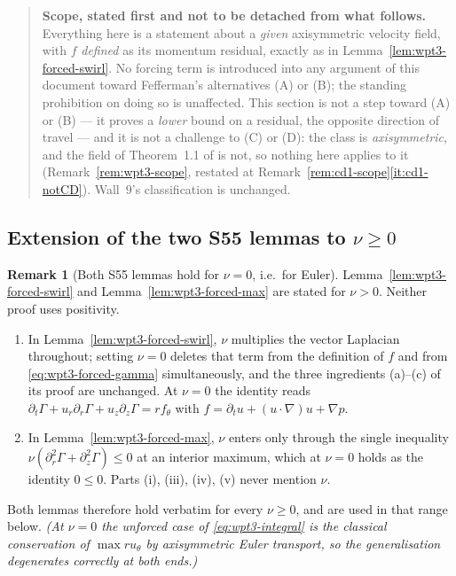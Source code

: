 \documentclass[11pt]{article}
\theoremstyle{definition}
\newtheorem{remark}[theorem]{Remark}
\theoremstyle{remark}
\newcommand{\grad}{\nabla}
\begin{document}
\begin{quote}\small
  \textbf{Scope, stated first and not to be detached from what follows.}
  Everything here is a statement about a \emph{given} axisymmetric velocity
  field, with $f$ \emph{defined} as its momentum residual, exactly as in
  Lemma~\ref{lem:wpt3-forced-swirl}. No forcing term is introduced into any
  argument of this document toward Fefferman's alternatives (A) or (B); the
  standing prohibition on doing so is unaffected. This section is not a step
  toward (A) or (B) --- it proves a \emph{lower} bound on a residual, the
  opposite direction of travel --- and it is not a challenge to (C) or (D):
  the class is \emph{axisymmetric}, and the field of Theorem~1.1 of
  \cite{OpenAI2026} is not, so nothing here applies to it
  (Remark~\ref{rem:wpt3-scope}, restated at
  Remark~\ref{rem:cd1-scope}\ref{it:cd1-notCD}). Wall~9's classification is
  unchanged.
\end{quote}

\subsection{Extension of the two S55 lemmas to \texorpdfstring{$\nu\geq0$}{nu
  >= 0}}
\label{subsec:cd1-nu0}

\begin{remark}[Both S55 lemmas hold for $\nu=0$, i.e.\ for Euler]
  \label{rem:cd1-euler}
  Lemma~\ref{lem:wpt3-forced-swirl} and Lemma~\ref{lem:wpt3-forced-max} are
  stated for $\nu>0$. Neither proof uses positivity.
  \begin{enumerate}[label=(\alph*),leftmargin=2.2em]
    \item In Lemma~\ref{lem:wpt3-forced-swirl}, $\nu$ multiplies the vector
      Laplacian throughout; setting $\nu=0$ deletes that term from the
      definition of $f$ and from \eqref{eq:wpt3-forced-gamma} simultaneously,
      and the three ingredients (a)--(c) of its proof are unchanged. At
      $\nu=0$ the identity reads
      $\partial_t\Gamma+u_r\partial_r\Gamma+u_z\partial_z\Gamma=rf_\theta$
      with $f=\partial_tu+(u\cdot\grad)u+\grad p$.
    \item In Lemma~\ref{lem:wpt3-forced-max}, $\nu$ enters only through the
      single inequality
      $\nu(\partial_r^2\Gamma+\partial_z^2\Gamma)\leq0$ at an interior
      maximum, which at $\nu=0$ holds as the identity $0\leq0$. Parts
      (i), (iii), (iv), (v) never mention $\nu$.
  \end{enumerate}
  Both lemmas therefore hold verbatim for every $\nu\geq0$, and are used in
  that range below. \emph{(At $\nu=0$ the unforced case of
  \eqref{eq:wpt3-integral} is the classical conservation of $\max ru_\theta$
  by axisymmetric Euler transport, so the generalisation degenerates
  correctly at both ends.)}
\end{remark}
\end{document}

